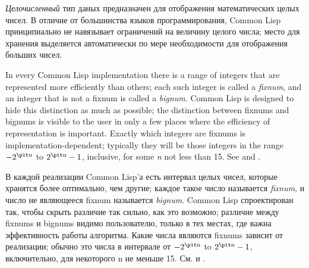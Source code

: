 \emph{Целочисленный} тип даных предназначен для отображения
математических целых чисел. В отличие от большинства языков
программирования, Common Lisp принципиально не навязывает
ограничений на величину целого числа; место для хранения
выделяется автоматически по мере необходимости для отображения
больших чисел.

In every Common Lisp implementation there is a range of integers that are
represented more efficiently than others; each such integer is called a
\emph{fixnum}, and an integer that is not a fixnum is called a
\emph{bignum}.
Common Lisp is designed to hide this distinction as much as possible;
the distinction between fixnums and bignums is visible to
the user in only a few places where the efficiency of representation is
important.  Exactly which integers are
fixnums is implementation-dependent; typically they will be those
integers in the range $-2^{\hbox{\scriptsize\it n}}$ to $2^{\hbox{\scriptsize\it n}}-1$,
inclusive, for some \emph{n} not less than 15.
See  and .

В каждой реализации Common Lisp'а есть интервал целых чисел,
которые хранятся более оптимально, чем другие; каждое такое число
называется \emph{fixnum}, и число не являющееся fixnum называется
\emph{bignum}. Common Lisp спроектирован так, чтобы скрыть различие так
сильно, как это возможно; различие между fixnums и bignums видимо
пользователю, только в тех местах, где важна эффективность работы
алгоритма. Какие числа являются fixnums зависит от реализации;
обычно это числа в интервале от $-2^{\hbox{\scriptsize\it n}}$ to
$2^{\hbox{\scriptsize\it n}}-1$, включительно, для некоторого n не меньше
15. См.  и . 

